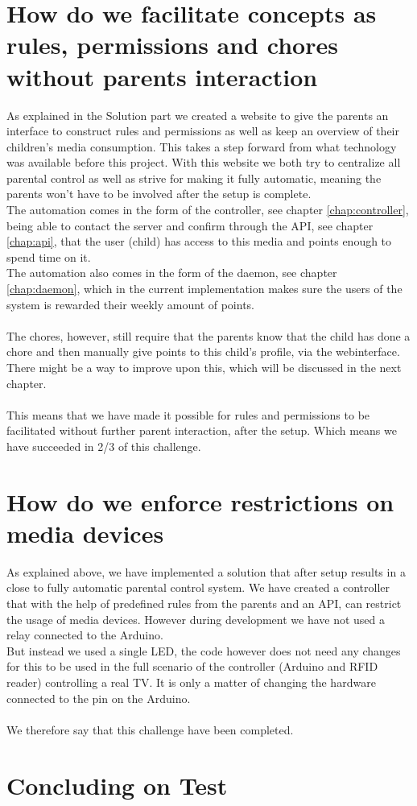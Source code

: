 \section*{How do we facilitate concepts as rules, permissions and chores without parents interaction}
As explained in the Solution part we created a website to give the parents an interface to construct rules and permissions as well as keep an overview of their children's media consumption. This takes a step forward from what technology was available before this project. With this website we both try to centralize all parental control as well as strive for making it fully automatic, meaning the parents won't have to be involved after the setup is complete.\\
The automation comes in the form of the controller, see chapter \vref{chap:controller}, being able to contact the server and confirm through the API, see chapter \vref{chap:api}, that the user (child) has access to this media and points enough to spend time on it.\\
The automation also comes in the form of the daemon, see chapter \vref{chap:daemon}, which in the current implementation makes sure the users of the system is rewarded their weekly amount of points.\\
\\
The chores, however, still require that the parents know that the child has done a chore and then manually give points to this child's profile, via the webinterface. There might be a way to improve upon this, which will be discussed in the next chapter.\\
\\
This means that we have made it possible for rules and permissions to be facilitated without further parent interaction, after the setup. Which means we have succeeded in 2/3 of this challenge.

\section*{How do we enforce restrictions on media devices}
As explained above, we have implemented a solution that after setup results in a close to fully automatic parental control system. We have created a controller that with the help of predefined rules from the parents and an API, can restrict the usage of media devices. However during development we have not used a relay connected to the Arduino. \\
But instead we used a single LED, the code however does not need any changes for this to be used in the full scenario of the controller (Arduino and RFID reader) controlling a real TV. It is only a matter of changing the hardware connected to the pin on the Arduino.\\
\\
We therefore say that this challenge have been completed.

\section*{Concluding on Test}